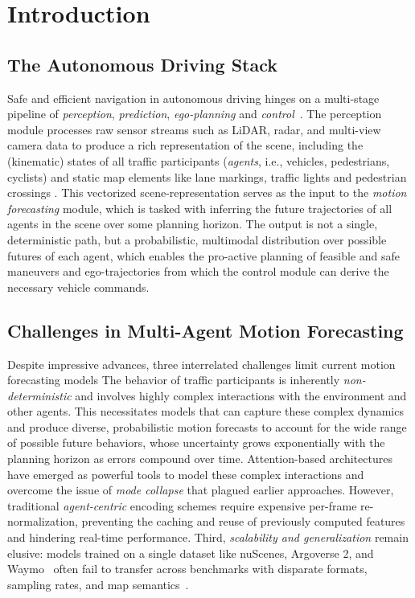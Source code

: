 \section{Introduction}
\label{sect:introduction}

\subsection{The Autonomous Driving Stack}
Safe and efficient navigation in autonomous driving hinges on a multi-stage pipeline of \emph{perception}, \emph{prediction}, \emph{ego-planning} and \emph{control}~\cite{hu2023planning}. The perception module processes raw sensor streams such as LiDAR, radar, and multi-view camera data to produce a rich representation of the scene, including the (kinematic) states of all traffic participants (\emph{agents}, i.e., vehicles, pedestrians, cyclists) and static map elements like lane markings, traffic lights and pedestrian crossings \cite{lmformerYadav2025}.
This vectorized scene-representation serves as the input to the \emph{motion forecasting} module, which is tasked with inferring the future trajectories of all agents in the scene over some planning horizon. The output is not a single, deterministic path, but a probabilistic, multimodal distribution over possible futures of each agent, which enables the pro-active planning of feasible and safe maneuvers and ego-trajectories from which the control module can derive the necessary vehicle commands.

\subsection{Challenges in Multi-Agent Motion Forecasting}
Despite impressive advances, three interrelated challenges limit current motion forecasting models
The behavior of traffic participants is inherently \emph{non-deterministic} and involves highly complex interactions with the environment and other agents. This necessitates models that can capture these complex dynamics and produce diverse, probabilistic motion forecasts to account for the wide range of possible future behaviors, whose uncertainty grows exponentially with the planning horizon as errors compound over time.
Attention-based architectures have emerged as powerful tools to model these complex interactions and overcome the issue of \emph{mode collapse} that plagued earlier approaches. However, traditional \emph{agent-centric} encoding schemes require expensive per-frame re-normalization, preventing the caching and reuse of previously computed features and hindering real-time performance\cite{qcnextZhou2023}.
Third, \emph{scalability and generalization} remain elusive: models trained on a single dataset like nuScenes, Argoverse 2, and Waymo~\cite{caesar2020nuscenes, av2Wilson2023, wmodSun2020} often fail to transfer across benchmarks with disparate formats, sampling rates, and map semantics~\cite{unitrajFeng2024}.

